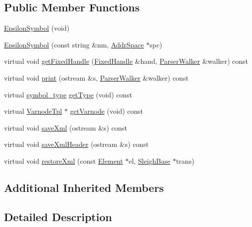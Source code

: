 \subsection*{Public Member Functions}
\begin{DoxyCompactItemize}
\item 
\mbox{\hyperlink{class_epsilon_symbol_a6019296237a85f6ff8f4fec57f2ffcd1}{Epsilon\+Symbol}} (void)
\item 
\mbox{\hyperlink{class_epsilon_symbol_af987a144c16806242cae207883fc21b4}{Epsilon\+Symbol}} (const string \&nm, \mbox{\hyperlink{class_addr_space}{Addr\+Space}} $\ast$spc)
\item 
virtual void \mbox{\hyperlink{class_epsilon_symbol_ae75ba4c46f54f5ee391f0a4ec8dd3933}{get\+Fixed\+Handle}} (\mbox{\hyperlink{struct_fixed_handle}{Fixed\+Handle}} \&hand, \mbox{\hyperlink{class_parser_walker}{Parser\+Walker}} \&walker) const
\item 
virtual void \mbox{\hyperlink{class_epsilon_symbol_aecbc7388e707d9e11625a9b4436f73a4}{print}} (ostream \&s, \mbox{\hyperlink{class_parser_walker}{Parser\+Walker}} \&walker) const
\item 
virtual \mbox{\hyperlink{class_sleigh_symbol_aba70f7f332fd63488c5ec4bd7807db41}{symbol\+\_\+type}} \mbox{\hyperlink{class_epsilon_symbol_adeb5f05c9e5550f3a35a223f826e1fd7}{get\+Type}} (void) const
\item 
virtual \mbox{\hyperlink{class_varnode_tpl}{Varnode\+Tpl}} $\ast$ \mbox{\hyperlink{class_epsilon_symbol_aee856179a5dd1c4395acbeda85cb14b4}{get\+Varnode}} (void) const
\item 
virtual void \mbox{\hyperlink{class_epsilon_symbol_a825d93a75ea8a0d3c3448ce5abef3f27}{save\+Xml}} (ostream \&s) const
\item 
virtual void \mbox{\hyperlink{class_epsilon_symbol_ace04d6ded42db2e187f83e90090d9718}{save\+Xml\+Header}} (ostream \&s) const
\item 
virtual void \mbox{\hyperlink{class_epsilon_symbol_a0ce24cb1b91e38a1c45b5ec9d6af553a}{restore\+Xml}} (const \mbox{\hyperlink{class_element}{Element}} $\ast$el, \mbox{\hyperlink{class_sleigh_base}{Sleigh\+Base}} $\ast$trans)
\end{DoxyCompactItemize}
\subsection*{Additional Inherited Members}


\subsection{Detailed Description}


